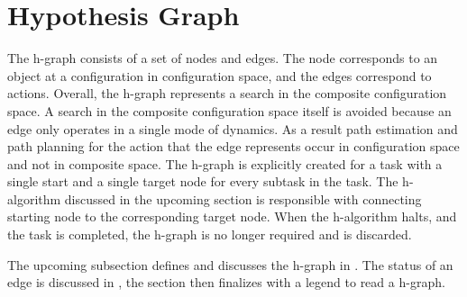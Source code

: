 \section{Hypothesis Graph}%
\label{sec:h-graph}
The \acf{h-graph} consists of a set of nodes and edges. The node corresponds to an object at a configuration in configuration space, and the edges correspond to actions. Overall, the \ac{h-graph} represents a search in the composite configuration space. A search in the composite configuration space itself is avoided because an edge only operates in a single mode of dynamics. As a result path estimation and path planning for the action that the edge represents occur in configuration space and not in composite space. The \ac{h-graph} is explicitly created for a task with a single start and a single target node for every subtask in the task. The \ac{h-algorithm} discussed in the upcoming section is responsible with connecting starting node to the corresponding target node. When the \ac{h-algorithm} halts, and the task is completed, the \ac{h-graph} is no longer required and is discarded.\bs

The upcoming subsection defines and discusses the \ac{h-graph} in . The status of an edge is discussed in , the section then finalizes with a legend to read a \ac{h-graph}.\bs


